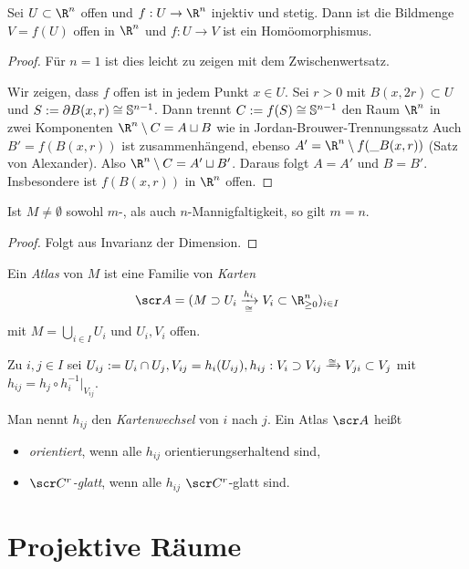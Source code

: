 \begin{st}
	Sei $U \subset \R^n$ offen und $f: U \to \R^n$ injektiv und stetig.
	Dann ist die Bildmenge $V = f(U)$ offen in $\R^n$ und $f: U \to V$ ist ein Homöomorphismus.
	\begin{proof}
		Für $n = 1$ ist dies leicht zu zeigen mit dem Zwischenwertsatz.

		Wir zeigen, dass $f$ offen ist in jedem Punkt $x \in U$.
		Sei $r > 0$ mit $B(x, 2r) \subset U$ und $S := \partial B(x,r) \cong \mathbb{S}^{n-1}$.
		Dann trennt $C := f(S) \cong \mathbb{S}^{n-1}$ den Raum $\R^n$ in zwei Komponenten $\R^n \setminus C = A \dunion B$ wie in Jordan-Brouwer-Trennungssatz %
		Auch $B' = f(B(x,r))$ ist zusammenhängend, ebenso $A' = \R^n \setminus f(\_B(x,r))$ (Satz von Alexander).
		Also $\R^n \setminus C = A' \dunion B'$.
		Daraus folgt $A = A'$ und $B = B'$.
		Insbesondere ist $f(B(x,r))$ in $\R^n$ offen.
	\end{proof}
\end{st}

\begin{st}
	Ist $M \neq \emptyset$ sowohl $m$-, als auch $n$-Mannigfaltigkeit, so gilt $m = n$.
	\begin{proof}
		Folgt aus Invarianz der Dimension.
	\end{proof}
\end{st}

\begin{df}
	Ein \emph{Atlas} von $M$ ist eine Familie von \emph{Karten}
	\[
		\scr A = (M \supset U_i \xrightarrow[\homeomorphic]{h_i} V_i \subset \R_{\ge 0}^n)_{i\in I}
	\]
	mit $M = \bigcup_{i \in I} U_i$ und $U_i, V_i$ offen.

	Zu $i,j \in I$ sei $U_{ij} := U_i \cap U_j, V_{ij} = h_i(U_{ij}), h_{ij} : V_i \supset V_{ij} \homeomorphicto V_{ji} \subset V_j$ mit $h_{ij} = h_j \circ h_i^{-1}|_{V_{ij}}$.

	Man nennt $h_{ij}$ den \emph{Kartenwechsel} von $i$ nach $j$.
	Ein Atlas $\scr A$ heißt
	\begin{itemize}
		\item
			\emph{orientiert}, wenn alle $h_{ij}$ orientierungserhaltend sind,
		\item
			\emph{$\scr C^r$-glatt}, wenn alle $h_{ij}$ $\scr C^r$-glatt sind.
	\end{itemize}
\end{df}


\section{Projektive Räume}


